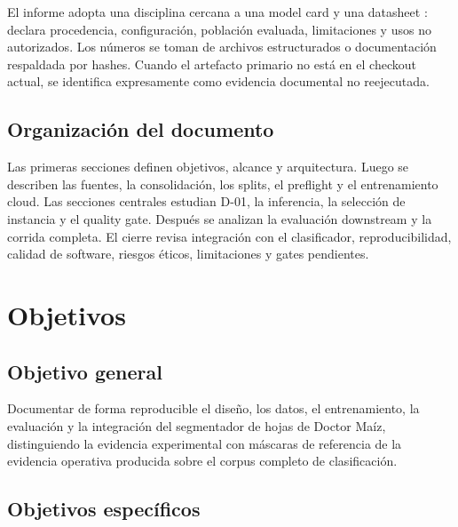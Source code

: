 \documentclass[11pt,a4paper]{article}
\begin{document}
El informe adopta una disciplina cercana a una model card \citep{mitchell2019modelcards} y una datasheet \citep{gebru2021datasheets}: declara procedencia, configuración, población evaluada, limitaciones y usos no autorizados. Los números se toman de archivos estructurados o documentación respaldada por hashes. Cuando el artefacto primario no está en el checkout actual, se identifica expresamente como evidencia documental no reejecutada.


\subsection{Organización del documento}

Las primeras secciones definen objetivos, alcance y arquitectura. Luego se describen las fuentes, la consolidación, los splits, el preflight y el entrenamiento cloud. Las secciones centrales estudian D-01, la inferencia, la selección de instancia y el quality gate. Después se analizan la evaluación downstream y la corrida completa. El cierre revisa integración con el clasificador, reproducibilidad, calidad de software, riesgos éticos, limitaciones y gates pendientes.


\section{Objetivos}

\subsection{Objetivo general}

Documentar de forma reproducible el diseño, los datos, el entrenamiento, la evaluación y la integración del segmentador de hojas de Doctor Maíz, distinguiendo la evidencia experimental con máscaras de referencia de la evidencia operativa producida sobre el corpus completo de clasificación.


\subsection{Objetivos específicos}
\end{document}
